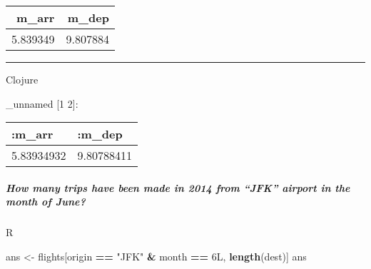 \documentclass[]{article}
\newenvironment{Shaded}{\begin{snugshade}}{\end{snugshade}}
\newcommand{\AttributeTok}[1]{\textcolor[rgb]{0.77,0.63,0.00}{#1}}
\newcommand{\DecValTok}[1]{\textcolor[rgb]{0.00,0.00,0.81}{#1}}
\newcommand{\KeywordTok}[1]{\textcolor[rgb]{0.13,0.29,0.53}{\textbf{#1}}}
\newcommand{\NormalTok}[1]{#1}
\newcommand{\OperatorTok}[1]{\textcolor[rgb]{0.81,0.36,0.00}{\textbf{#1}}}
\newcommand{\StringTok}[1]{\textcolor[rgb]{0.31,0.60,0.02}{#1}}
\newcommand{\VariableTok}[1]{\textcolor[rgb]{0.00,0.00,0.00}{#1}}
\let\oldsubparagraph\subparagraph
\renewcommand{\subparagraph}[1]{\oldsubparagraph{#1}\mbox{}}
\begin{document}
\begin{longtable}[]{@{}rr@{}}
\toprule
m\_arr & m\_dep\tabularnewline
\midrule
\endhead
5.839349 & 9.807884\tabularnewline
\bottomrule
\end{longtable}

\begin{center}\rule{0.5\linewidth}{0.5pt}\end{center}

Clojure

\begin{Shaded}
\end{Shaded}

\_unnamed {[}1 2{]}:

\begin{longtable}[]{@{}ll@{}}
\toprule
:m\_arr & :m\_dep\tabularnewline
\midrule
\endhead
5.83934932 & 9.80788411\tabularnewline
\bottomrule
\end{longtable}

\hypertarget{how-many-trips-have-been-made-in-2014-from-jfk-airport-in-the-month-of-june}{%
\subparagraph{How many trips have been made in 2014 from ``JFK'' airport
in the month of
June?}\label{how-many-trips-have-been-made-in-2014-from-jfk-airport-in-the-month-of-june}}

R

\begin{Shaded}
\begin{Highlighting}[]
\NormalTok{ans <-}\StringTok{ }\NormalTok{flights[origin }\OperatorTok{==}\StringTok{ "JFK"} \OperatorTok{&}\StringTok{ }\NormalTok{month }\OperatorTok{==}\StringTok{ }\NormalTok{6L, }\KeywordTok{length}\NormalTok{(dest)]}
\NormalTok{ans}
\end{Highlighting}
\end{Shaded}
\end{document}
